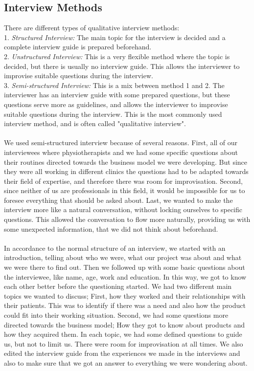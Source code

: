 \subsection{Interview Methods}
There are different types of qualitative interview methods:\cite{interview} \cite{interview2} \\ 
1. \emph{Structured Interview:} The main topic for the interview is decided and a complete interview guide is prepared beforehand. \\ 
2. \emph{Unstructured Interview:} This is a very flexible method where the topic is decided, but there is usually no interview guide. This allows the interviewer to improvise suitable questions during the interview. \\ 
3. \emph{Semi-structured Interview:} This is a mix between method 1 and 2. The interviewer has an interview guide with some prepared questions, but these questions serve more as guidelines, and allows the interviewer to improvise suitable questions during the interview. This is the most commonly used interview method, and is often called "qualitative interview". \cite{interview} \cite{interview2} \\ \\
We used semi-structured interview because of several reasons. First, all of our interviewees where physiotherapists and we had some specific questions about their routines directed towards the business model we were developing. But since they were all working in different clinics the questions had to be adapted towards their field of expertise, and therefore there was room for improvisation. Second, since neither of us are professionals in this field, it would be impossible for us to foresee everything that should be asked about. Last, we wanted to make the interview more like a natural conversation, without locking ourselves to specific questions. This allowed the conversation to flow more naturally, providing us with some unexpected information, that we did not think about beforehand. \\ \\
In accordance to the normal structure of an interview, we started with an introduction, telling about who we were, what our project was about and what we were there to find out. Then we followed up with some basic questions about the interviewee, like name, age, work and education. In this way, we got to know each other better before the questioning started. We had two different main topics we wanted to discuss; First, how they worked and their relationships with their patients. This was to identify if there was a need and also how the product could fit into their working situation. Second, we had some questions more directed towards the business model; How they got to know about products and how they acquired them. In each topic, we had some defined questions to guide us, but not to limit us. There were room for improvisation at all times. We also edited the interview guide from the experiences we made in the interviews and also to make sure that we got an answer to everything we were wondering about.

